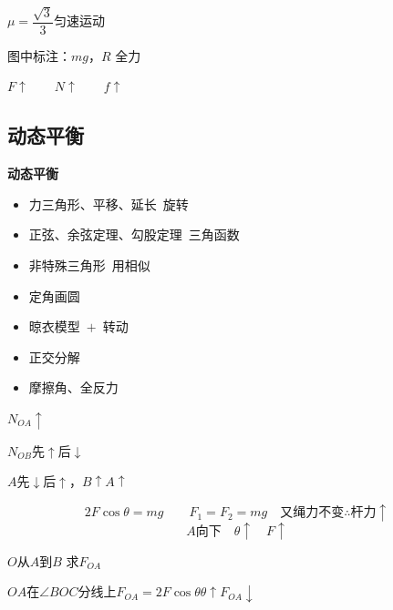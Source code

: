 $\mu=\dfrac{\sqrt{3}}{3}$\quad 匀速运动

图中标注：$mg$，$R$ 全力

$F\uparrow\qquad N\uparrow\qquad f\uparrow$

\subsection{动态平衡}
\textbf{动态平衡}
\begin{itemize}
\item 力三角形、平移、延长\ 旋转
\item 正弦、余弦定理、勾股定理\ 三角函数
\item 非特殊三角形\ 用相似
\item 定角画圆
\item 晾衣模型\ $+$\ 转动 %
\item 正交分解
\item 摩擦角、全反力
\end{itemize}



$N_{OA}\uparrow$

$N_{OB}$先$\uparrow$后$\downarrow$

$A$先$\downarrow$后$\uparrow$，$B\uparrow$\quad $A\uparrow$ %

\begin{problem}
\begin{solution}
\[ 2F\cos\theta=mg\qquad F_1=F_2=mg\quad\text{又绳力不变}\therefore\text{杆力}\uparrow \] %
\[ A\text{向下}\quad\theta\uparrow\quad F\uparrow \]
\end{solution}
\end{problem}

\begin{problem}
$O$从$A$到$B$ 求$F_{OA}$ %
\begin{solution}
$OA$在$\angle BOC$分线上\qquad $F_{OA}=2F\cos\theta$\qquad $\theta\uparrow$\quad $F_{OA}\downarrow$
\end{solution}
\end{problem}

